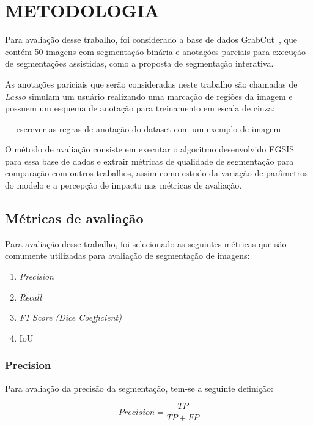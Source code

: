 \chapter{METODOLOGIA}\label{cap:metodologia}

Para avaliação desse trabalho, foi considerado a base de dados
GrabCut~\cite{rother2004grabcut}, que contém 50 imagens com segmentação
binária e anotações parciais para execução de segmentações assistidas,
como a proposta de segmentação interativa.

As anotações pariciais que serão consideradas neste trabalho são
chamadas de \textit{Lasso} simulam um usuário realizando uma marcação
de regiões da imagem e possuem um esquema de anotação para treinamento em
escala de cinza:

--- escrever as regras de anotação do dataset com um exemplo de imagem

O método de avaliação consiste em executar o algoritmo desenvolvido
\gls{EGSIS} para essa base de dados e extrair métricas de qualidade de
segmentação para comparação com outros trabalhos, assim como estudo da
variação de parâmetros do modelo e a percepção de impacto nas métricas
de avaliação.

\section{Métricas de avaliação}\label{sec:metricas-avaliacao}

Para avaliação desse trabalho, foi selecionado as seguintes métricas
que são comumente utilizadas para avaliação de segmentação de imagens:

\begin{enumerate}
\item \textit{Precision}
\item \textit{Recall}
\item \textit{F1 Score (Dice Coefficient)}
\item IoU
\end{enumerate}


\subsection{Precision}\label{sec:precision}

Para avaliação da precisão da segmentação, tem-se a seguinte definição:

\begin{equation}\label{eq:precision}
  Precision = \dfrac{TP}{TP + FP}
\end{equation}

